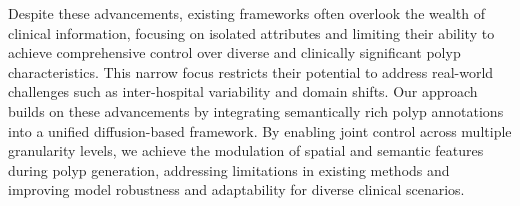 Despite these advancements, existing frameworks often overlook the wealth of clinical information, focusing on isolated attributes and limiting their ability to achieve comprehensive control over diverse and clinically significant polyp characteristics. This narrow focus restricts their potential to address real-world challenges such as inter-hospital variability and domain shifts.
Our approach builds on these advancements by integrating semantically rich polyp annotations into a unified diffusion-based framework. By enabling joint control across multiple granularity levels, we achieve the modulation of spatial and semantic features during polyp generation, addressing limitations in existing methods and improving model robustness and adaptability for diverse clinical scenarios.